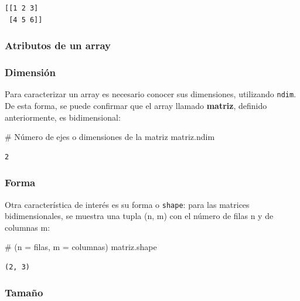 \documentclass[
  letterpaper,
  DIV=11,
  numbers=noendperiod]{scrreprt}
\newenvironment{Shaded}{\begin{snugshade}}{\end{snugshade}}
\newcommand{\CommentTok}[1]{\textcolor[rgb]{0.37,0.37,0.37}{#1}}
\newcommand{\NormalTok}[1]{\textcolor[rgb]{0.00,0.23,0.31}{#1}}
\begin{document}
\begin{verbatim}
[[1 2 3]
 [4 5 6]]
\end{verbatim}

\subsubsection{Atributos de un array}\label{atributos-de-un-array}

\subsubsection{Dimensión}\label{dimensiuxf3n}

Para caracterizar un array es necesario conocer sus dimensiones,
utilizando \texttt{ndim}. De esta forma, se puede confirmar que el array
llamado \textbf{matriz}, definido anteriormente, es bidimensional:

\begin{Shaded}
\begin{Highlighting}[]
\CommentTok{\# Número de ejes o dimensiones de la matriz}
\NormalTok{matriz.ndim}
\end{Highlighting}
\end{Shaded}

\begin{verbatim}
2
\end{verbatim}

\subsubsection{Forma}\label{forma}

Otra característica de interés es su forma o \texttt{shape}: para las
matrices bidimensionales, se muestra una tupla (n, m) con el número de
filas n y de columnas m:

\begin{Shaded}
\begin{Highlighting}[]
\CommentTok{\# (n = filas, m = columnas)}
\NormalTok{matriz.shape}
\end{Highlighting}
\end{Shaded}

\begin{verbatim}
(2, 3)
\end{verbatim}

\subsubsection{Tamaño}\label{tamauxf1o}
\end{document}
